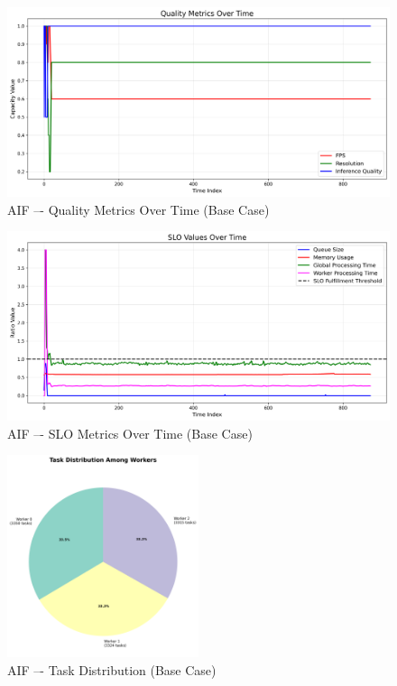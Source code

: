 \begin{figure}[h]
    \centering
    \includegraphics[width=\textwidth]{img/results/basic/active_inference_relative_control_quality_metrics.png}
    \caption{AIF –- Quality Metrics Over Time (Base Case)}
\end{figure}
\begin{figure}[h]
    \centering
    \includegraphics[width=\textwidth]{img/results/basic/active_inference_relative_control_slo_values.png}
    \caption{AIF –- SLO Metrics Over Time (Base Case)}
\end{figure}
\begin{figure}[h]
    \centering
    \includegraphics[width=0.5\textwidth]{img/results/basic/active_inference_relative_control_task_distribution_pie.png}
    \caption{AIF –- Task Distribution (Base Case)}
\end{figure}



